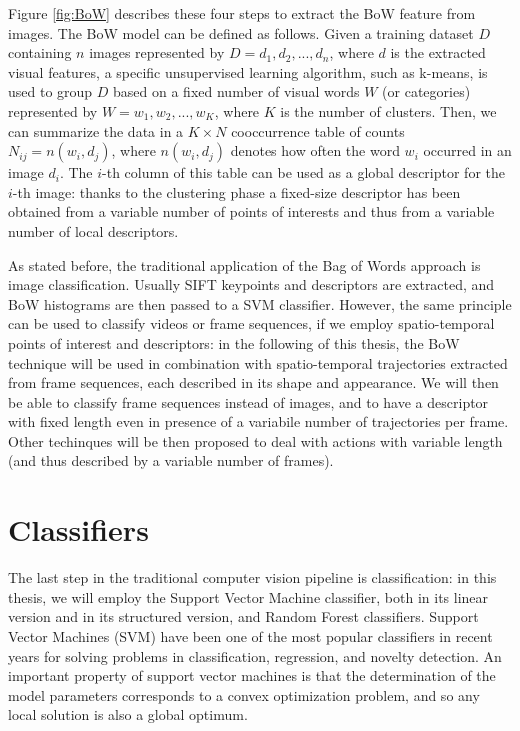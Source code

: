 Figure \ref{fig:BoW} describes these four steps to extract the BoW feature from images. The BoW model can be defined as follows. Given a training dataset $D$ containing $n$ images represented by $D = d_1, d_2, \text{...}, d_n$, where $d$ is the extracted visual features, a specific unsupervised learning algorithm, such as k-means, is used to group $D$ based on a fixed number of visual words $W$ (or categories) represented by $W = w_1,w_2, \text{...}, w_K$, where $K$ is the number of clusters. Then, we can summarize the data in a $K\times N$ cooccurrence table of counts $N_{i j} = n(w_i, d_j )$, where $n(w_i, d_j)$ denotes how often the word $w_i$ occurred in an image $d_i$. The $i$-th column of this table can be used as a global descriptor for the $i$-th image: thanks to the clustering phase a fixed-size descriptor has been obtained from a variable number of points of interests and thus from a variable number of local descriptors.

As stated before, the traditional application of the Bag of Words approach is image classification. Usually SIFT keypoints and descriptors are extracted, and BoW histograms are then passed to a SVM classifier. However, the same principle can be used to classify videos or frame sequences, if we employ spatio-temporal points of interest and descriptors: in the following of this thesis, the BoW technique will be used in combination with spatio-temporal trajectories extracted from frame sequences, each described in its shape and appearance. We will then be able to classify frame sequences instead of images, and to have a descriptor with fixed length even in presence of a variabile number of trajectories per frame. Other techinques will be then proposed to deal with actions with variable length (and thus described by a variable number of frames).


\section{Classifiers}
The last step in the traditional computer vision pipeline is classification: in this thesis, we will employ the Support Vector Machine classifier, both in its linear version and in its structured version, and Random Forest classifiers. Support Vector Machines (SVM) have been one of the most popular classifiers in recent years for solving problems in classification, regression, and novelty detection. An important property of support vector machines is that the determination of the model parameters corresponds to a convex optimization problem, and so any local solution is also a global optimum.

